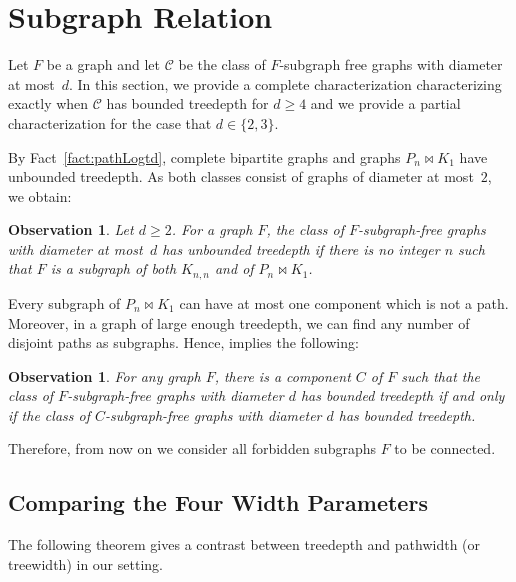 \documentclass[runningheads,envcountsame]{llncs}
\newtheorem{observation}[theorem]{Observation}
\newcommand{\forbiddenGraph}{F}
\newcommand{\join}{\bowtie}
\begin{document}
\section{Subgraph Relation}\label{sec:subgraph}

Let $\forbiddenGraph$ be a graph and let $\mathcal{C}$ be the class of
$\forbiddenGraph$-subgraph free graphs with diameter at most~$d$. In this
section, we provide a complete characterization characterizing exactly when
$\mathcal{C}$ has bounded treedepth for $d\geq 4$ and we provide a
partial characterization for the case that $d \in \{2,3\}$.

\noindent
By Fact~\ref{fact:pathLogtd}, complete
bipartite graphs and graphs $P_n\join K_1$ have unbounded treedepth. As both classes consist of graphs of diameter at most~$2$, we obtain:
\begin{observation}\label{obs:canonicalUnboundedExamples}
Let $d\geq 2$.
  For a graph $\forbiddenGraph$, the class of
  $\forbiddenGraph$-subgraph-free graphs with diameter at most~$d$ has unbounded treedepth if 
  there is no integer $n$ such that
  $\forbiddenGraph$ is a subgraph of both $K_{n,n}$ and of $P_n\join
  K_1$.
\end{observation}
Every subgraph of $P_n\join K_1$ can have at most one
component which is not a path. Moreover, in a graph of large enough
treedepth, we can find any number of disjoint paths as subgraphs. Hence,  implies the following:

\begin{observation}
  For any graph $\forbiddenGraph$, there is a component $C$
  of $\forbiddenGraph$ such that the class of
  $\forbiddenGraph$-subgraph-free graphs with diameter $d$ has bounded
  treedepth if and only if the class of $C$-subgraph-free graphs with
  diameter $d$ has
  bounded treedepth.
\end{observation}
Therefore, from now on we consider all forbidden subgraphs
$\forbiddenGraph$ to be connected. \\



\subsection{Comparing the Four Width Parameters}\label{s-comp}
The following theorem gives a contrast between treedepth and pathwidth (or treewidth) in our setting. 
\end{document}
